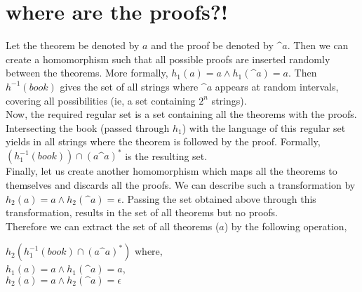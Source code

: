 \documentclass[11pt,letterpaper]{article}
\begin{document}
\section{where are the proofs?!}
Let the theorem be denoted by $a$ and the proof be denoted by $\^{a}$. Then we can create a homomorphism such that all possible proofs are inserted randomly between the theorems. More formally, $h_1(a) = a \wedge h_1(\^{a}) = a$. Then $h^{-1}(book)$ gives the set of all strings where $\^{a}$ appears at random intervals, covering all possibilities (ie, a set containing $2^n$ strings). \\
Now, the required regular set is a set containing all the theorems with the proofs. Intersecting the book (passed through $h_1$) with the language of this regular set yields in all strings where the theorem is followed by the proof. Formally, $(h_1^{-1}(book)) \cap (a\^{a})^*$ is the resulting set. \\
Finally, let us create another homomorphism which maps all the theorems to themselves and discards all the proofs. We can describe such a transformation by $h_2(a) = a \wedge h_2(\^{a}) = \epsilon$. Passing the set obtained above through this transformation, results in the set of all theorems but no proofs. \\
Therefore we can extract the set of all theorems ($a$) by the following operation,
\begin{center}
    $h_2(h_1^{-1}(book) \cap (a\^{a})^*)$ where, \\
    $h_1(a) = a \wedge h_1(\^{a}) = a$, \\
    $h_2(a) = a \wedge h_2(\^{a}) = \epsilon$
\end{center}
\end{document}
